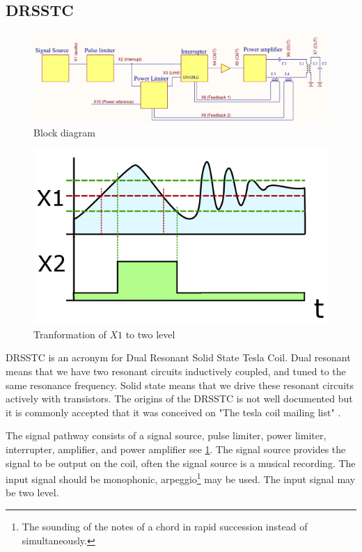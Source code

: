 \subsection{DRSSTC}
\label{DRSSTC}

\begin{figure}
    \centering
    \includegraphics[width=\textwidth]{img/FunksjonsBlokkskjema.pdf}
    \caption{Block diagram}
    \label{fig:func_block}
\end{figure}

\begin{figure}
    \centering
    \includegraphics[width=\textwidth]{img/Smitt_hysteresis_graph_x1_x2.png}
    \caption{Tranformation of $X1$ to two level \citep{wikimedia}}       
    \label{fig:schmidt}
\end{figure}


DRSSTC is an acronym for Dual Resonant Solid State Tesla Coil. Dual resonant means that we have two resonant circuits inductively coupled, and tuned to the same resonance frequency. Solid state means that we drive these resonant circuits actively with transistors. The origins of the DRSSTC is not well documented but it is commonly accepted that it was conceived on "The tesla coil mailing list" \citep{pupman}.

The signal pathway consists of a signal source, pulse limiter, power limiter, interrupter, amplifier, and power amplifier see \cref{fig:func_block}.
The signal source provides the signal to be output on the coil, often the signal source is a musical recording.
The input signal should be monophonic, arpeggio\footnote{The sounding of the notes of a chord in rapid succession instead of simultaneously.} may be used. The input signal may be two level.


